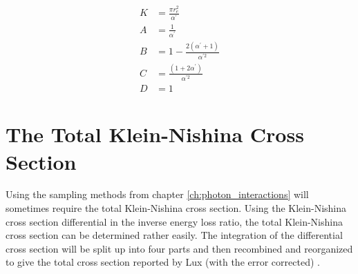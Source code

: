 \begin{align}
  K & = \frac{\pi r_e^2}{\alpha^{'}} \nonumber \\
  A & = \frac{1}{\alpha^{'}} \nonumber \\
  B & = 1 - \frac{2(\alpha^{'}+1)}{\alpha^{'2}} \nonumber \\
  C & = \frac{(1+2\alpha^{'})}{\alpha^{'2}} \nonumber \\
  D & = 1 \nonumber 
\end{align}

\section{The Total Klein-Nishina Cross Section}
Using the sampling methods from chapter \ref{ch:photon_interactions} will 
sometimes require the total Klein-Nishina cross section. Using the 
Klein-Nishina cross section differential in the inverse energy loss ratio,
the total Klein-Nishina cross section can be determined rather easily. The
integration of the differential cross section will be split up into four parts
and then recombined and reorganized to give the total cross section reported by 
Lux (with the error corrected) \citep{lux_monte_1991}. 
